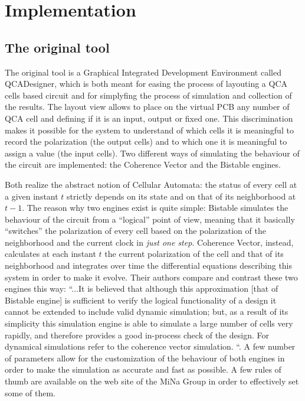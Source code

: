 \chapter{Implementation}\label{sec:implementation}
\section {The original tool}
The original tool is a Graphical Integrated Development Environment called QCADesigner, which is both meant for easing the process of layouting a QCA cells based circuit and for simplyfing the process of simulation and collection of the results. The layout view allows to place on the virtual PCB any number of QCA cell and defining if it is an input, output or fixed one. This discrimination makes it possible for the system to understand of which cells it is meaningful to record the polarization (the output cells) and to which one it is meaningful to assign a value (the input cells). Two different ways of simulating the behaviour of the circuit are implemented: the Coherence Vector and the Bistable engines. 

Both realize the abstract notion of Cellular Automata: the status of every cell at a given instant $t$ strictly depends on its state and on that of its neighborhood at $t-1$. The reason why two engines exist is quite simple: Bistable simulates the behaviour of the circuit from a ``logical'' point of view, meaning that it basically ``switches'' the polarization of every cell based on the polarization of the neighborhood and the current clock in \textsl{just one step}. Coherence Vector, instead, calculates at each instant $t$ the current polarization of the cell and that of its neighborhood and integrates over time the differential equations describing this system in order to make it evolve. Their authors compare and contrast these two engines this way: ``...It is believed that although this approximation [that of Bistable engine] is sufficient to verify the logical functionality of a design it cannot be extended to include valid dynamic simulation; but, as a result of its simplicity this simulation engine is able to simulate a large number of cells very rapidly, and therefore provides a good in-process check of the design. For dynamical simulations refer to the coherence vector simulation. ``. A few number of parameters allow for the customization of the behaviour of both engines in order to make the simulation as accurate and fast as possible. A few rules of thumb are available on the web site of the MiNa Group in order to effectively set some of them.

